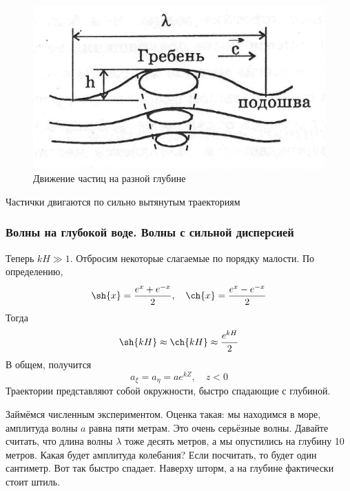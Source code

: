 \begin{figure}[H]
    \centering
    \includegraphics[scale=0.7]{photo/ellipse2.png}
    \caption{Движение частиц на разной глубине}
    \label{fig:ellipse2}
\end{figure}

Частички двигаются по сильно вытянутым траекториям

\subsubsection{Волны на глубокой воде. Волны с сильной дисперсией}

Теперь $kH\gg 1$. Отбросим некоторые слагаемые по порядку малости. По определению, 
\begin{equation}
    \sh{x} = \frac{e^x+e^{-x}}{2}, \quad \ch{x} = \frac{e^x-e^{-x}}{2}
\end{equation}
Тогда 
\begin{equation}
    \sh{kH}\approx\ch{kH}\approx \frac{e^{kH}}{2} 
\end{equation}
В общем, получится
\begin{equation}
    a_\xi = a_\eta = ae^{kZ}, \quad z<0
\end{equation}
Траектории представляют собой окружности, быстро спадающие с глубиной. 

Займёмся численным экспериментом. 
Оценка такая: мы находимся в море, амплитуда волны $a$ равна пяти метрам.
Это очень серьёзные волны. 
Давайте считать, что длина волны $\lambda$ тоже десять метров, а мы опустились на глубину 10 метров.
Какая будет амплитуда колебания? Если посчитать, то будет один сантиметр. Вот так быстро спадает. Наверху шторм, а на глубине фактически стоит штиль.

